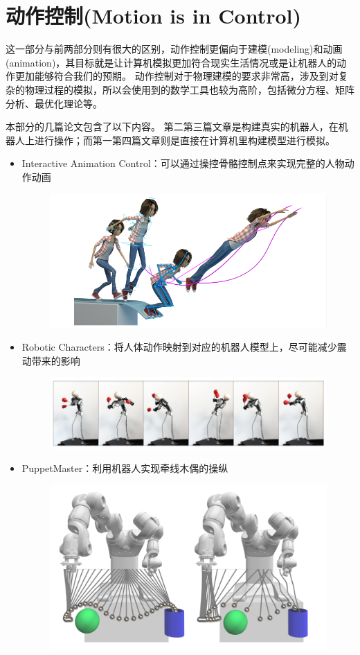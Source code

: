 \documentclass[logo,reportComp]{thesis}
\begin{document}
\section{动作控制(Motion is in Control)}
\label{sec:motion}
这一部分与前两部分则有很大的区别，动作控制更偏向于建模(modeling)和动画(animation)，其目标就是让计算机模拟更加符合现实生活情况或是让机器人的动作更加能够符合我们的预期。
动作控制对于物理建模的要求非常高，涉及到对复杂的物理过程的模拟，所以会使用到的数学工具也较为高阶，包括微分方程、矩阵分析、最优化理论等。

本部分的几篇论文包含了以下内容。
第二第三篇文章是构建真实的机器人，在机器人上进行操作；而第一第四篇文章则是直接在计算机里构建模型进行模拟。
\begin{itemize}
	\item Interactive Animation Control\cite{ciccone:interative_animation}：可以通过操控骨骼控制点来实现完整的人物动作动画
\begin{figure}[H]
\centering
\includegraphics[width=0.8\linewidth]{animation-control.png}
\end{figure}
	\item Robotic Characters\cite{hoshiyari:robotic}：将人体动作映射到对应的机器人模型上，尽可能减少震动带来的影响
\begin{figure}[H]
\centering
\includegraphics[width=0.8\linewidth]{robotic-character.png}
\end{figure}
	\item PuppetMaster\cite{zimmermann:puppetmaster}：利用机器人实现牵线木偶的操纵
\begin{figure}[H]
\centering
\includegraphics[width=0.4\linewidth]{puppetmaster.png}

\end{figure}
\end{itemize}
\end{document}
